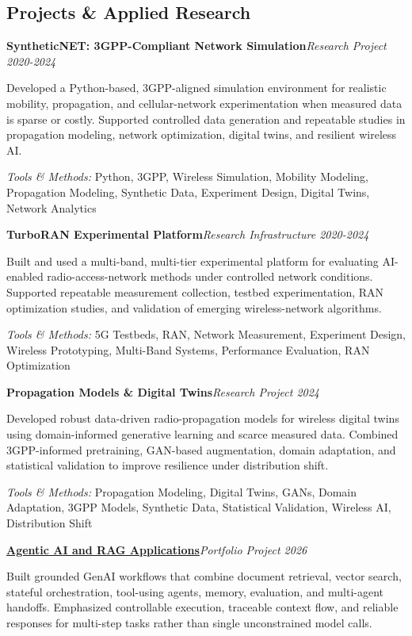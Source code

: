 \documentclass[9pt,letterpaper]{extarticle}
\newcommand{\entry}[2]{\Needspace{4\baselineskip}\textbf{#1}\hfill\textit{#2}\par}
\begin{document}
\subsection{Projects \& Applied Research}
\entry{SyntheticNET: 3GPP-Compliant Network Simulation}{Research Project \textbar{} 2020-2024}
Developed a Python-based, 3GPP-aligned simulation environment for realistic mobility, propagation, and cellular-network experimentation when measured data is sparse or costly. Supported controlled data generation and repeatable studies in propagation modeling, network optimization, digital twins, and resilient wireless AI.\par
{\small\textit{Tools \& Methods:} Python, 3GPP, Wireless Simulation, Mobility Modeling, Propagation Modeling, Synthetic Data, Experiment Design, Digital Twins, Network Analytics\par}
\vspace{1pt}
\entry{TurboRAN Experimental Platform}{Research Infrastructure \textbar{} 2020-2024}
Built and used a multi-band, multi-tier experimental platform for evaluating AI-enabled radio-access-network methods under controlled network conditions. Supported repeatable measurement collection, testbed experimentation, RAN optimization studies, and validation of emerging wireless-network algorithms.\par
{\small\textit{Tools \& Methods:} 5G Testbeds, RAN, Network Measurement, Experiment Design, Wireless Prototyping, Multi-Band Systems, Performance Evaluation, RAN Optimization\par}
\vspace{1pt}
\entry{Propagation Models \& Digital Twins}{Research Project \textbar{} 2024}
Developed robust data-driven radio-propagation models for wireless digital twins using domain-informed generative learning and scarce measured data. Combined 3GPP-informed pretraining, GAN-based augmentation, domain adaptation, and statistical validation to improve resilience under distribution shift.\par
{\small\textit{Tools \& Methods:} Propagation Modeling, Digital Twins, GANs, Domain Adaptation, 3GPP Models, Synthetic Data, Statistical Validation, Wireless AI, Distribution Shift\par}
\vspace{1pt}
\entry{\href{https://github.com/WaseemRaza844/agentic-ai-projects-by-was}{Agentic AI and RAG Applications}}{Portfolio Project \textbar{} 2026}
Built grounded GenAI workflows that combine document retrieval, vector search, stateful orchestration, tool-using agents, memory, evaluation, and multi-agent handoffs. Emphasized controllable execution, traceable context flow, and reliable responses for multi-step tasks rather than single unconstrained model calls.\par
\end{document}
